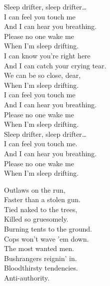 Sleep drifter, sleep drifter… \\

I can feel you touch me \\
And I can hear you breathing. \\
Please no one wake me \\
When I'm sleep drifting. \\

I can know you're right here \\
And I can catch your crying tear. \\
We can be so close, dear, \\
When I'm sleep drifting. \\

I can feel you touch me \\
And I can hear you breathing. \\
Please no one wake me \\
When I'm sleep drifting. \\

Sleep drifter, sleep drifter… \\

I can feel you touch me. \\
And I can hear you breathing. \\
Please no one wake me \\
When I'm sleep drifting. \\





Outlaws on the run, \\
Faster than a stolen gun. \\
Tied naked to the trees, \\
Killed so gruesomely. \\

Burning tents to the ground. \\
Cops won't wave 'em down. \\
The most wanted men. \\
Bushrangers reignin' in. \\

Bloodthirsty tendencies. \\
Anti-authority. \\

